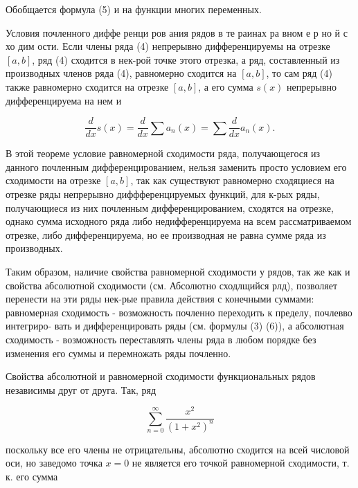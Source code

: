 \documentclass[10pt]{article}
\begin{document}
Обобщается формула (5) и на функции многих переменных.



Условия почленного диффе ренци ров ания рядов в те раинах ра вном е р но й с хо дим ости. Если члены ряда (4) непрерывно дифференцируемы на отрезке $[a, b]$, ряд (4) сходится в нек-рой точке этого отрезка, а ряд, составленный из производных членов ряда (4), равномерно сходится на $[a, b]$, то сам ряд (4) также равномерно сходится на отрезке $[a, b]$, а его сумма $s(x)$ непрерывно дифференцируема на нем и



\[

\frac{d}{d x} s(x)=\frac{d}{d x} \sum a_{n}(x)=\sum \frac{d}{d x} a_{n}(x) .

\]



В этой теореме условие равномерной сходимости ряда, получающегося из данного почленным дифференцированием, нельзя заменить просто условием его сходимости на отрезке $[a, b]$, так как существуют равномерно сходяциеся на отрезке ряды непрерывно диффференцируемых функций, для к-рых ряды, получающиеся из них почленным дифференцированием, сходятся на отрезке, однако сумма исходного ряда либо недифференцируема на всем рассматриваемом отрезке, либо дифференцируема, но ее производная не равна сумме ряда из производных.



Таким образом, наличие свойства равномерной сходимости у рядов, так же как и свойства абсолютной сходимости (см. Абсолютно сходлщийся рлд), позволяет перенести на эти ряды нек-рые правила действия с конечными суммами: равномерная сходимость - возможность почленно переходить к пределу, почлевво интегриро- вать и дифференцировать ряды (см. формулы (3) (6)), а абсолютная сходимость - возможность переставлять члены ряда в любом порядке без изменения его суммы и перемножать ряды почленно.



Свойства абсолютной и равномерной сходимости функциональных рядов независимы друг от друга. Так, ряд



\[

\sum_{n=0}^{\infty} \frac{x^{2}}{\left(1+x^{2}\right)^{n}}

\]



поскольку все его члены не отрицательны, абсолютно сходится на всей числовой оси, но заведомо точка $x=0$ не является его точкой равномерной сходимости, т. к. его сумма
\end{document}
